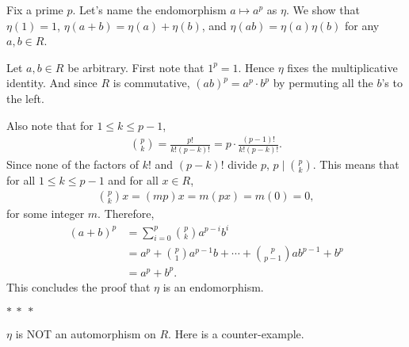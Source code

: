 \documentclass[12pt]{article}
\begin{document}
\begin{fproof}[Jacobson 2.7.4]
  Fix a prime \(p\).
  Let's name the endomorphism \(a \mapsto a^{p}\) as \(\eta\).
  We show that \(\eta(1) = 1\), \(\eta(a+b) = \eta(a)+ \eta(b)\), and \(\eta(ab) = \eta(a)\eta(b)\) for any \(a,b \in R\).

  Let \(a,b \in R\) be arbitrary.
  First note that \(1^p = 1\). Hence \(\eta\) fixes the multiplicative identity.
  And since \(R\) is commutative, \((ab)^p = a^p \cdot b^p\) by permuting all the \(b\)'s to the left.

  Also note that for \(1 \leq k \leq p-1\),
  \begin{align*}
    \binom{p}{k} = \frac{p!}{k!(p-k)!} = p \cdot \frac{(p-1)!}{k!(p-k)!}.
  \end{align*}
  Since none of the factors of \(k!\) and \((p-k)!\) divide \(p\), \(p \mid \binom{p}{k}\). This means that for all \(1 \leq k \leq p-1\) and for all \(x \in R\),
  \begin{align*}
    \binom{p}{k}x = (mp)x = m(px) = m(0) = 0,
  \end{align*}
  for some integer \(m\).
  Therefore,
  \begin{align*}
    (a+b)^p &= \sum_{i=0}^{p} \binom{p}{k} a^{p-i}b^{i}\\
    & = a^p + \binom{p}{1}a^{p-1}b + \cdots + \binom{p}{p-1}ab^{p-1} + b^p\\
    & = a^p + b^p.
  \end{align*}
  This concludes the proof that \(\eta\) is an endomorphism.
  \begin{center}
    \(\ast~\ast~\ast\)
  \end{center}
  \(\eta\) is NOT an automorphism on \(R\). Here is a counter-example.

\end{fproof}
\newpage

\begin{fproof}[Jacobson 2.7.9]

\end{fproof}
\newpage

\begin{fproof}[Jacobson 2.7.10]

\end{fproof}
\end{document}
